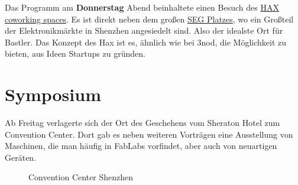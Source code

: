 \documentclass{\basedir/fablab-document}
\begin{document}
Das Programm am \textbf{Donnerstag} Abend beinhaltete einen Besuch des
\href{https://hax.co/about/}{HAX coworking spaces}. Es ist direkt neben
dem großen \href{https://en.wikipedia.org/wiki/SEG_Plaza}{SEG Platzes},
wo ein Großteil der Elektronikmärkte in Shenzhen angesiedelt sind. Also
der idealste Ort für Bastler. Das Konzept des Hax ist es, ähnlich wie
bei 3nod, die Möglichkeit zu bieten, aus Ideen Startups zu gründen.

\section*{Symposium}

Ab Freitag verlagerte sich der Ort des Geschehens vom Sheraton Hotel zum
Convention Center. Dort gab es neben weiteren Vorträgen eine Ausstellung
von Maschinen, die man häufig in FabLabs vorfindet, aber auch von
neuartigen Geräten.

\begin{figure}[htbp]
	\noindent{}
	\caption{Convention Center Shenzhen}
	\label{convention_center}
\end{figure}
\end{document}
